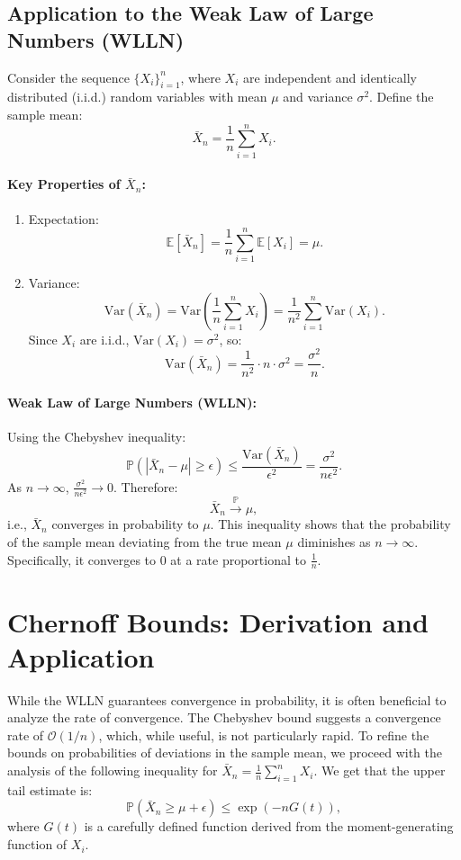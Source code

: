 \subsection{Application to the Weak Law of Large Numbers (WLLN)}

Consider the sequence \( \{X_i\}_{i=1}^n \), where \( X_i \) are independent and identically distributed (i.i.d.) random variables with mean \( \mu \) and variance \( \sigma^2 \). Define the sample mean:
\[
\bar{X}_n = \frac{1}{n} \sum_{i=1}^n X_i.
\]

\paragraph{Key Properties of \( \bar{X}_n \):}
\begin{enumerate}
    \item Expectation:
    \[
    \mathbb{E}[\bar{X}_n] = \frac{1}{n} \sum_{i=1}^n \mathbb{E}[X_i] = \mu.
    \]
    \item Variance:
    \[
    \mathrm{Var}(\bar{X}_n) = \mathrm{Var}\left(\frac{1}{n} \sum_{i=1}^n X_i \right) = \frac{1}{n^2} \sum_{i=1}^n \mathrm{Var}(X_i).
    \]
    Since \( X_i \) are i.i.d., \( \mathrm{Var}(X_i) = \sigma^2 \), so:
    \[
    \mathrm{Var}(\bar{X}_n) = \frac{1}{n^2} \cdot n \cdot \sigma^2 = \frac{\sigma^2}{n}.
    \]
\end{enumerate}

\paragraph{Weak Law of Large Numbers (WLLN):}
Using the Chebyshev inequality:
\[
\mathbb{P}(|\bar{X}_n - \mu| \geq \epsilon) \leq \frac{\mathrm{Var}(\bar{X}_n)}{\epsilon^2} = \frac{\sigma^2}{n \epsilon^2}.
\]
As \( n \to \infty \), \( \frac{\sigma^2}{n \epsilon^2} \to 0 \). Therefore:
\[
\bar{X}_n \xrightarrow{\mathbb{P}} \mu,
\]
i.e., \( \bar{X}_n \) converges in probability to \( \mu \). This inequality shows that the probability of the sample mean deviating from the true mean \( \mu \) diminishes as \( n \to \infty \). Specifically, it converges to \( 0 \) at a rate proportional to \( \frac{1}{n} \).

\section{Chernoff Bounds: Derivation and Application}
While the WLLN guarantees convergence in probability, it is often beneficial to analyze the rate of convergence. The Chebyshev bound suggests a convergence rate of \( \mathcal{O}(1/n) \), which, while useful, is not particularly rapid. To refine the bounds on probabilities of deviations in the sample mean, we proceed with the analysis of the following inequality for \( \bar{X}_n = \frac{1}{n} \sum_{i=1}^n X_i \). We get that the upper tail estimate is:
\[
\mathbb{P}(\bar{X}_n \geq \mu + \epsilon) \leq \exp(-n G(t)),
\]
where \( G(t) \) is a carefully defined function derived from the moment-generating function of \( X_i \). 

